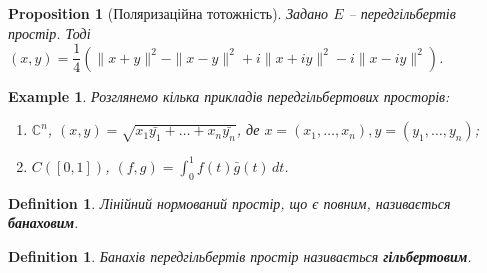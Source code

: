 \documentclass[a4paper, 10pt]{article}
\theoremstyle{theoremdd}
\newtheorem{definition}[theorem]{Definition}
\newtheorem{example}[theorem]{Example}
\newtheorem{proposition}[theorem]{Proposition}
\begin{document}
\begin{proposition}[Поляризаційна тотожність]
Задано $E$ -- передгільбертів простір. Тоді\\
$(x,y) = \dfrac{1}{4} \left( \|x+y\|^2 - \|x-y\|^2 + i \|x+iy\|^2 - i \|x-iy\|^2 \right)$.
\end{proposition}

\begin{example}
Розглянемо кілька прикладів передгільбертових просторів:
\begin{enumerate}[nosep,wide=0pt,label={\arabic*)}]
\item $\mathbb{C}^n$, \qquad $(x,y) = \displaystyle\sqrt{x_1 \bar{y_1} + \dots + x_n \bar{y_n}}$, де $x = (x_1,\dots,x_n), y = (y_1,\dots,y_n)$;
\item $C([0,1])$, \qquad $(f,g) = \displaystyle\int_0^1 f(t)\bar{g}(t)\,dt$.
\end{enumerate}
\end{example}

\begin{definition}
Лінійний нормований простір, що є повним, називається \textbf{банаховим}.
\end{definition}

\begin{definition}
Банахів передгільбертів простір називається \textbf{гільбертовим}.
\end{definition}
\end{document}
